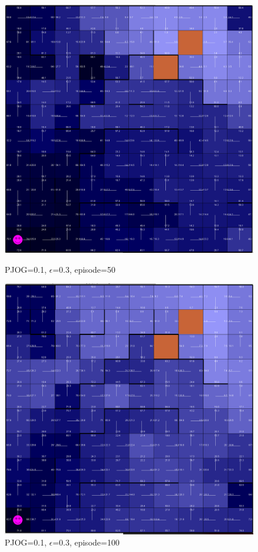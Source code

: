 \documentclass[11pt]{article}
\begin{document}
\begin{figure}[!htb]
   \begin{minipage}{0.34\textwidth}
     \centering
     \includegraphics[width=1.2\linewidth]{../figures/q2_3_50.png}
     \caption{PJOG=0.1, $\epsilon$=0.3, episode=50}\label{Fig:q2_3_50}
   \end{minipage}\hfill
   \begin{minipage}{0.34\textwidth}
     \centering
     \includegraphics[width=1.2\linewidth]{../figures/q2_3_100.png}
     \caption{PJOG=0.1, $\epsilon$=0.3, episode=100}\label{Fig:q2_3_100}
   \end{minipage}
\end{figure}
\end{document}
